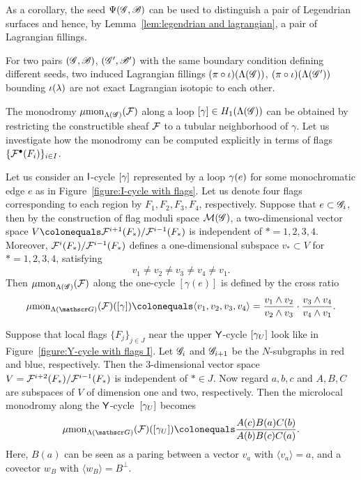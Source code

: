As a corollary, the seed $\Psi(\mathscr{G}, \mathscr{B})$ can be used to distinguish a pair of Legendrian surfaces and hence, by Lemma~\ref{lem:legendrian and lagrangian}, a pair of Lagrangian fillings.

\begin{corollary}\label{corollary:distinct seeds imples distinct fillings}
For two pairs $(\mathscr{G}, \mathscr{B})$, $(\mathscr{G}', \mathscr{B}')$ with the same boundary condition defining different seeds, two induced Lagrangian fillings $(\pi\circ\iota)(\Lambda(\mathscr{G}))$, $(\pi\circ\iota)(\Lambda(\mathscr{G}'))$ bounding $\iota(\lambda)$ are not exact Lagrangian isotopic to each other.
\end{corollary}




The monodromy $\operatorname{\mu mon}_{\Lambda(\mathscr{G})}(\mathcal{F})$ along a loop $[\gamma]\in H_1(\Lambda(\mathscr{G}))$ can be obtained by restricting the constructible sheaf $\mathcal{F}$ to a tubular neighborhood of $\gamma$. 
Let us investigate how the monodromy can be computed explicitly in terms of flags $\{\mathcal{F}^\bullet(F_i)\}_{i \in I}$.

Let us consider an $\mathsf{I}$-cycle $[\gamma]$ represented by a loop $\gamma(e)$ for some monochromatic edge $e$ as in Figure~\ref{figure:I-cycle with flags}.
Let us denote four flags corresponding to each region by $F_1,F_2,F_3,F_4$, respectively.
Suppose that $e \subset \mathscr{G}_i$, then by the construction of flag moduli space $\mathcal{M}(\mathscr{G})$, a two-dimensional vector space $V\colonequals\cF^{i+1}(F_*)/\cF^{i-1}(F_*)$ is independent of $*=1,2,3,4$. Moreover, $\mathcal{F}^{i}(F_*)/\mathcal{F}^{i-1}(F_*)$ defines a one-dimensional subspace $v_*\subset V$ for $*=1,2,3,4$, satisfying
\[
v_1\neq v_2 \neq v_3 \neq v_4 \neq v_1.
\]
Then $\operatorname{\mu mon}_{\Lambda(\mathscr{G})}(\mathcal{F})$ along the one-cycle $[\gamma(e)]$ is defined by the cross ratio \[
\mmon_{\Legendrian(\ngraph)}(\cF)([\cycle])\colonequals\langle v_1,v_2,v_3,v_4 \rangle=\frac{v_1 \wedge v_2}{v_2 \wedge v_3}\cdot\frac{v_3 \wedge v_4}{v_4\wedge v_1}.
\]


Suppose that local flags $\{F_j\}_{j\in J}$ near the upper $\mathsf{Y}$-cycle $[\gamma_U]$ look like in Figure~\ref{figure:Y-cycle with flags I}. 
Let $\mathscr{G}_i$ and $\mathscr{G}_{i+1}$ be the $N$-subgraphs in red and blue, respectively.
Then the $3$-dimensional vector space $V=\mathcal{F}^{i+2}(F_*)/\mathcal{F}^{i-1}(F_*)$ is independent of $*\in J$. Now regard $a,b,c$ and $A,B,C$ are subspaces of $V$ of dimension one and two, respectively. Then the microlocal monodromy along the $\mathsf{Y}$-cycle~$[\gamma_U]$  becomes
\[
\mmon_{\Legendrian(\ngraph)}(\cF)([\cycle_U])\colonequals\frac{A(c)B(a)C(b)}{A(b)B(c)C(a)}.
\]
Here, $B(a)$ can be seen as a paring between a vector $v_a$ with $\langle  v_a \rangle=a$, and a covector $w_B$ with $\langle w_B \rangle=B^\perp$.

